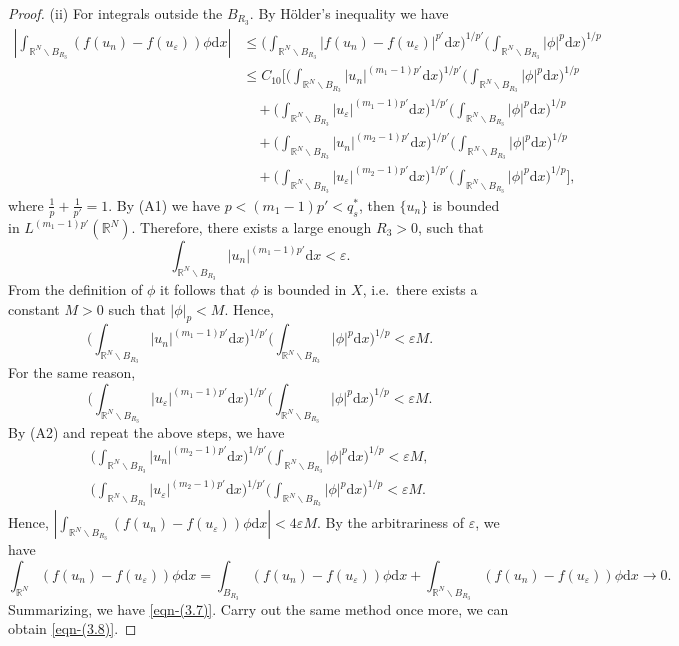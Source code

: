 \documentclass[10pt,a4paper]{amsart}
\numberwithin{equation}{section}
\begin{document}
\begin{proof}
(ii) For integrals outside the $B_{R_3}$. By H\"{o}lder's  inequality we have
\begin{align*}
|\int_{\mathbb{R}^N\backslash{B_{R_3}}}(f(u_n)-f(u_\varepsilon))
\phi\mathrm{d}x|
&\leq \Big(\int_{\mathbb{R}^N\backslash{B_{R_3}}}
|f(u_n)-f(u_\varepsilon)|^{p'}\mathrm{d}x\Big)^{1/p'}
\Big(\int_{\mathbb{R}^N\backslash{B_{R_3}}}|\phi|^{p}\mathrm{d}x\Big)^{1/p}\\
&\leq C_{10}\Big[\Big(\int_{\mathbb{R}^N\backslash{B_{R_3}}}|u_n|^{(m_1-1)p'}
 \mathrm{d}x\Big)^{1/p'}\Big(\int_{\mathbb{R}^N\backslash{B_{R_3}}}|\phi|^{p}
 \mathrm{d}x\Big)^{1/p}\\
&\quad +\Big(\int_{\mathbb{R}^N\backslash{B_{R_3}}}|u_\varepsilon|^{(m_1-1)p'}
 \mathrm{d}x\Big)^{1/p'}\Big(\int_{\mathbb{R}^N\backslash{B_{R_3}}}|\phi|^{p}
 \mathrm{d}x\Big)^{1/p}\\
&\quad +\Big(\int_{\mathbb{R}^N\backslash{B_{R_3}}}|u_n|^{(m_2-1)p'}
 \mathrm{d}x\Big)^{1/p'}
 \Big(\int_{\mathbb{R}^N\backslash{B_{R_3}}}|\phi|^{p}\mathrm{d}x\Big)^{1/p}\\
&\quad +\Big(\int_{\mathbb{R}^N\backslash{B_{R_3}}}|u_\varepsilon|^{(m_2-1)p'}
 \mathrm{d}x\Big)^{1/p'}\Big(\int_{\mathbb{R}^N\backslash{B_{R_3}}}|\phi|^{p}
 \mathrm{d}x\Big)^{1/p}\Big],
\end{align*}
where $\frac{1}{p}+\frac{1}{p'}=1$. By (A1) we have $p<(m_1-1)p'<q_{s}^{*}$, then  
$\{u_n\}$ is bounded  in $L^{(m_1-1)p'}(\mathbb{R}^N)$.  Therefore,
there exists a large enough $R_3>0$, such that 
$$
\int_{\mathbb{R}^N\backslash{B_{R_3}}}|u_n|^{(m_1-1)p'}\mathrm{d}x<\varepsilon.
$$
From the definition of $\phi$ it follows that $\phi$ is bounded in $X$, i.e.\
there exists a constant $M>0$ such that $|\phi|_p<M$.
Hence,
$$
\Big(\int_{\mathbb{R}^N\backslash{B_{R_3}}}|u_n|^{(m_1-1)p'}
\mathrm{d}x\Big)^{1/p'} \Big(\int_{\mathbb{R}^N\backslash{B_{R_3}}}
|\phi|^{p}\mathrm{d}x\Big)^{1/p}<\varepsilon M. 
$$
For the same reason,
$$
\Big(\int_{\mathbb{R}^N\backslash{B_{R_3}}}|u_\varepsilon|^{(m_1-1)p'}\mathrm{d}x
 \Big)^{1/p'}
 \Big(\int_{\mathbb{R}^N\backslash{B_{R_3}}}|\phi|^{p}\mathrm{d}x\Big)^{1/p}
 <\varepsilon M.
 $$
By (A2) and repeat the above steps, we have
\begin{gather*}
\Big(\int_{\mathbb{R}^N\backslash{B_{R_3}}}|u_n|^{(m_2-1)p'}\mathrm{d}x\Big)^{1/p'}
\Big(\int_{\mathbb{R}^N\backslash{B_{R_3}}}|\phi|^{p}\mathrm{d}x\Big)^{1/p}
<\varepsilon M,\\
\Big(\int_{\mathbb{R}^N\backslash{B_{R_3}}}|u_\varepsilon|^{(m_2-1)p'}\mathrm{d}x
\Big)^{1/p'}
\Big(\int_{\mathbb{R}^N\backslash{B_{R_3}}}|\phi|^{p}\mathrm{d}x\Big)^{1/p}
<\varepsilon M.
\end{gather*}
Hence, $|\int_{\mathbb{R}^N\backslash{B_{R_3}}}(f(u_n)-f(u_\varepsilon))
\phi\mathrm{d}x|<4\varepsilon M$.
By the arbitrariness of $\varepsilon$, we have
$$
\int_{\mathbb{R}^N}(f(u_n)-f(u_\varepsilon))\phi\mathrm{d}x
=\int_{B_{R_3}}(f(u_n)-f(u_\varepsilon))\phi\mathrm{d}x
 +\int_{\mathbb{R}^N\backslash{B_{R_3}}}(f(u_n)-f(u_\varepsilon))\phi\mathrm{d}x\to 0.
$$
Summarizing, we have \eqref{eqn-(3.7)}.
Carry out the same method once more, we can obtain \eqref{eqn-(3.8)}.


\end{proof}
\end{document}
